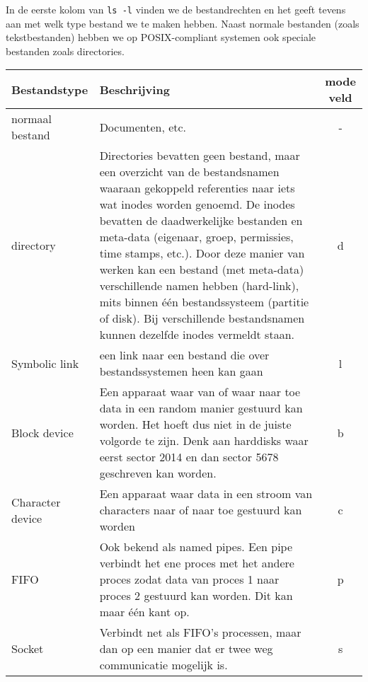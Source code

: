 In de eerste kolom van \texttt{ls -l} vinden we de bestandrechten en het geeft tevens aan met welk type bestand we te maken hebben. Naast normale bestanden (zoals tekstbestanden) hebben we op POSIX-compliant systemen ook speciale bestanden zoals directories.

\begin{center}
\begin{tabular}{ | l | l | c | }
\hline
Bestandstype & Beschrijving & mode veld \\
\hline
\hline
 normaal bestand & Documenten, etc. & - \\
\hline
 directory & Directories bevatten geen bestand, maar een overzicht van de bestandsnamen waaraan gekoppeld referenties naar iets wat inodes worden genoemd. De inodes bevatten de daadwerkelijke bestanden en meta-data (eigenaar, groep, permissies, time stamps, etc.). Door deze manier van werken kan een bestand (met meta-data) verschillende namen hebben (hard-link), mits binnen \'e\'en bestandssysteem (partitie of disk). Bij verschillende bestandsnamen kunnen dezelfde inodes vermeldt staan. & d \\
\hline
 Symbolic link & een link naar een bestand die over bestandssystemen heen kan gaan & l \\
\hline
Block device & Een apparaat waar van of waar naar toe data in een random manier gestuurd kan worden. Het hoeft dus niet in de juiste volgorde te zijn. Denk aan harddisks waar eerst sector 2014 en dan sector 5678 geschreven kan worden. & b \\
\hline
Character device & Een apparaat waar data in een stroom van characters naar of naar toe gestuurd kan worden & c \\
\hline
FIFO & Ook bekend als named pipes. Een pipe verbindt het ene proces met het andere proces zodat data van proces 1 naar proces 2 gestuurd kan worden. Dit kan maar \'e\'en kant op. & p \\
\hline
Socket & Verbindt net als FIFO's processen, maar dan op een manier dat er twee weg communicatie mogelijk is. & s \\
\hline
\end{tabular}
\end{center}

